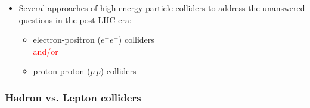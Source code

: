\begin{frame}
\begin{itemize}
  \item Several approaches of high-energy particle colliders to
    address the unanswered questions in the post-LHC era:
    \begin{itemize}
    \item electron-positron ($e^+e^-$) colliders
      \\
      \textcolor{Red}{and/or}
      \\
    \item proton-proton ($p~p$) colliders
    \end{itemize}
  \end{itemize}

\end{frame}

\begin{frame}
  \frametitle{Hadron vs. Lepton colliders}

  \begin{columns}[t]
    \centering
    


\end{columns}
\end{frame}
